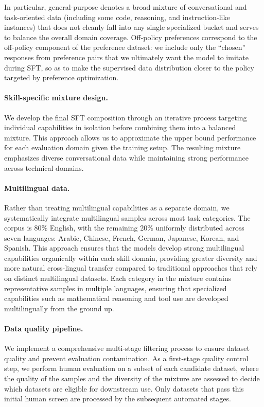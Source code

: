 \documentclass{article}
\begin{document}
In particular, general-purpose denotes a broad mixture of conversational and task-oriented data (including some code, reasoning, and instruction-like instances) that does not cleanly fall into any single specialized bucket and serves to balance the overall domain coverage. Off-policy preferences correspond to the off-policy component of the preference dataset: we include only the ``chosen'' responses from preference pairs that we ultimately want the model to imitate during SFT, so as to make the supervised data distribution closer to the policy targeted by preference optimization.

\paragraph{Skill-specific mixture design.} We develop the final SFT composition through an iterative process targeting individual capabilities in isolation before combining them into a balanced mixture. This approach allows us to approximate the upper bound performance for each evaluation domain given the training setup. The resulting mixture emphasizes diverse conversational data while maintaining strong performance across technical domains.

\paragraph{Multilingual data.} Rather than treating multilingual capabilities as a separate domain, we systematically integrate multilingual samples across most task categories. The corpus is 80\% English, with the remaining 20\% uniformly distributed across seven languages: Arabic, Chinese, French, German, Japanese, Korean, and Spanish. This approach ensures that the models develop strong multilingual capabilities organically within each skill domain, providing greater diversity and more natural cross-lingual transfer compared to traditional approaches that rely on distinct multilingual datasets. Each category in the mixture contains representative samples in multiple languages, ensuring that specialized capabilities such as mathematical reasoning and tool use are developed multilingually from the ground up.

\paragraph{Data quality pipeline.} We implement a comprehensive multi-stage filtering process to ensure dataset quality and prevent evaluation contamination. As a first-stage quality control step, we perform human evaluation on a subset of each candidate dataset, where the quality of the samples and the diversity of the mixture are assessed to decide which datasets are eligible for downstream use. Only datasets that pass this initial human screen are processed by the subsequent automated stages. 
\end{document}

